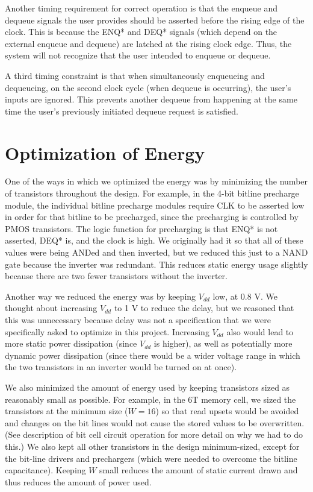 \documentclass[12pt]{report}
\begin{document}
Another timing requirement for correct operation is that the enqueue and dequeue signals the user provides should be asserted before the rising edge of the clock. This is because the ENQ* and DEQ* signals (which depend on the external enqueue and dequeue) are latched at the rising clock edge. Thus, the system will not recognize that the user intended to enqueue or dequeue.

A third timing constraint is that when simultaneously enqueueing and dequeueing, on the second clock cycle (when dequeue is occurring), the user's inputs are ignored. This prevents another dequeue from happening at the same time the user's previously initiated dequeue request is satisfied.

\newpage
\section*{Optimization of Energy}
One of the ways in which we optimized the energy was by minimizing the number of transistors throughout the design. For example, in the 4-bit bitline precharge module, the individual bitline precharge modules require CLK to be asserted low in order for that bitline to be precharged, since the precharging is controlled by PMOS transistors. The logic function for precharging is that ENQ* is not asserted, DEQ* is, and the clock is high. We originally had it so that all of these values were being ANDed and then inverted, but we reduced this just to a NAND gate because the inverter was redundant. This reduces static energy usage slightly because there are two fewer transistors without the inverter.

Another way we reduced the energy was by keeping $V_{dd}$ low, at 0.8 V. We thought about increasing $V_{dd}$ to 1 V to reduce the delay, but we reasoned that this was unnecessary because delay was not a specification that we were specifically asked to optimize in this project. Increasing $V_{dd}$ also would lead to more static power dissipation (since $V_{dd}$ is higher), as well as potentially more dynamic power dissipation (since there would be a wider voltage range in which the two transistors in an inverter would be turned on at once).

We also minimized the amount of energy used by keeping transistors sized as reasonably small as possible. For example, in the 6T memory cell, we sized the transistors at the minimum size ($W = 16$) so that read upsets would be avoided and changes on the bit lines would not cause the stored values to be overwritten. (See description of bit cell circuit operation for more detail on why we had to do this.) We also kept all other transistors in the design minimum-sized, except for the bit-line drivers and prechargers (which were needed to overcome the bitline capacitance). Keeping $W$ small reduces the amount of static current drawn and thus reduces the amount of power used.
\end{document}
